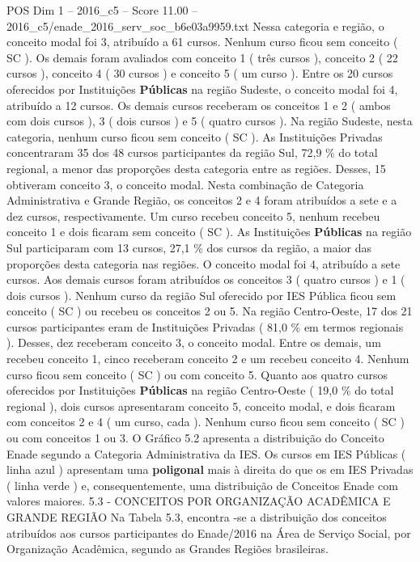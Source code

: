 \begin{textsample}{POS Dim 1 – 2016\_c5 – Score 11.00 – 2016\_c5/enade\_2016\_serv\_soc\_b6e03a9959.txt}
Nessa categoria e região, o conceito modal foi 3, atribuído a 61 cursos.
Nenhum curso ficou sem conceito ( SC ).
Os demais foram avaliados com conceito 1 ( três cursos ), conceito 2 ( 22 cursos ), conceito 4 ( 30 cursos ) e conceito 5 ( um curso ).
Entre os 20 cursos oferecidos por Instituições \textbf{Públicas} na região Sudeste, o conceito modal foi 4, atribuído a 12 cursos.
Os demais cursos receberam os conceitos 1 e 2 ( ambos com dois cursos ), 3 ( dois cursos ) e 5 ( quatro cursos ).
Na região Sudeste, nesta categoria, nenhum curso ficou sem conceito ( SC ).
As Instituições Privadas concentraram 35 dos 48 cursos participantes da região Sul, 72,9 \% do total regional, a menor das proporções desta categoria entre as regiões.
Desses, 15 obtiveram conceito 3, o conceito modal.
Nesta combinação de Categoria Administrativa e Grande Região, os conceitos 2 e 4 foram atribuídos a sete e a dez cursos, respectivamente.
Um curso recebeu conceito 5, nenhum recebeu conceito 1 e dois ficaram sem conceito ( SC ).
As Instituições \textbf{Públicas} na região Sul participaram com 13 cursos, 27,1 \% dos cursos da região, a maior das proporções desta categoria nas regiões.
O conceito modal foi 4, atribuído a sete cursos.
Aos demais cursos foram atribuídos os conceitos 3 ( quatro cursos ) e 1 ( dois cursos ).
Nenhum curso da região Sul oferecido por IES Pública ficou sem conceito ( SC ) ou recebeu os conceitos 2 ou 5.
Na região Centro-Oeste, 17 dos 21 cursos participantes eram de Instituições Privadas ( 81,0 \% em termos regionais ).
Desses, dez receberam conceito 3, o conceito modal.
Entre os demais, um recebeu conceito 1, cinco receberam conceito 2 e um recebeu conceito 4.
Nenhum curso ficou sem conceito ( SC ) ou com conceito 5.
Quanto aos quatro cursos oferecidos por Instituições \textbf{Públicas} na região Centro-Oeste ( 19,0 \% do total regional ), dois cursos apresentaram conceito 5, conceito modal, e dois ficaram com conceitos 2 e 4 ( um curso, cada ).
Nenhum curso ficou sem conceito ( SC ) ou com conceitos 1 ou 3.
O Gráfico 5.2 apresenta a distribuição do Conceito Enade segundo a Categoria Administrativa da IES.
Os cursos em IES Públicas ( linha azul ) apresentam uma \textbf{poligonal} mais à direita do que os em IES Privadas ( linha verde ) e, consequentemente, uma distribuição de Conceitos Enade com valores maiores. 5.3 - CONCEITOS POR ORGANIZAÇÃO ACADÊMICA E GRANDE REGIÃO Na Tabela 5.3, encontra -se a distribuição dos conceitos atribuídos aos cursos participantes do Enade/2016 na Área de Serviço Social, por Organização Acadêmica, segundo as Grandes Regiões brasileiras.

\end{textsample}
